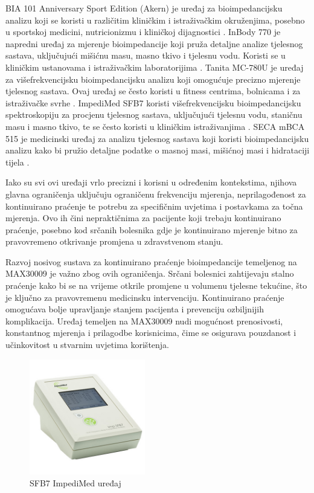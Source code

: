 \documentclass[../diplomski_rad.tex]{subfiles}
\begin{document}
BIA 101 Anniversary Sport Edition (Akern) je uređaj za bioimpedancijsku analizu koji se koristi u različitim kliničkim 
i istraživačkim okruženjima, posebno u sportskoj medicini, nutricionizmu i kliničkoj dijagnostici \cite{Wiech2022}.  
InBody 770 je napredni uređaj za mjerenje bioimpedancije koji pruža detaljne analize tjelesnog sastava, 
uključujući mišićnu masu, masno tkivo i tjelesnu vodu.  
Koristi se u kliničkim ustanovama i istraživačkim laboratorijima \cite{Choi2022}. 
Tanita MC-780U je uređaj za višefrekvencijsku bioimpedancijsku analizu koji omogućuje precizno mjerenje tjelesnog sastava. 
Ovaj uređaj se često koristi u fitness centrima, bolnicama i za istraživačke svrhe \cite{Slazak2024}. 
ImpediMed SFB7 koristi višefrekvencijsku bioimpedancijsku spektroskopiju za procjenu tjelesnog sastava, 
uključujući tjelesnu vodu, staničnu masu i masno tkivo, te se često koristi u kliničkim istraživanjima \cite{Freeborn2018}. 
SECA mBCA 515 je medicinski uređaj za analizu tjelesnog sastava koji koristi bioimpedancijsku analizu 
kako bi pružio detaljne podatke o masnoj masi, mišićnoj masi i hidrataciji tijela \cite{Lahav2021}. 

Iako su svi ovi uređaji vrlo precizni i korisni u određenim kontekstima, 
njihova glavna ograničenja uključuju ograničenu frekvenciju mjerenja, 
neprilagođenost za kontinuirano praćenje te potrebu za specifičnim uvjetima i postavkama za točna mjerenja. 
Ovo ih čini nepraktičnima za pacijente koji trebaju kontinuirano praćenje, posebno kod srčanih bolesnika 
gdje je kontinuirano mjerenje bitno za pravovremeno otkrivanje promjena u zdravstvenom stanju.

Razvoj nosivog sustava za kontinuirano praćenje bioimpedancije 
temeljenog na MAX30009 je važno zbog ovih ograničenja. 
Srčani bolesnici zahtijevaju stalno praćenje kako bi se na vrijeme otkrile promjene u volumenu tjelesne tekućine, 
što je ključno za pravovremenu medicinsku intervenciju. Kontinuirano praćenje omogućava bolje 
upravljanje stanjem pacijenta i prevenciju ozbiljnijih komplikacija. 
Uređaj temeljen na MAX30009 nudi mogućnost prenosivosti, konstantnog mjerenja i prilagodbe korisnicima, 
čime se osigurava pouzdanost i učinkovitost u stvarnim uvjetima korištenja.

\begin{figure}[htb]
    \centering
    \includegraphics[width=0.45\textwidth]{Figures/sfb7.jpg} 
    \caption{SFB7 ImpediMed uređaj \cite{sfb7}}
    \label{slk:sfb7}
\end{figure}
\end{document}
